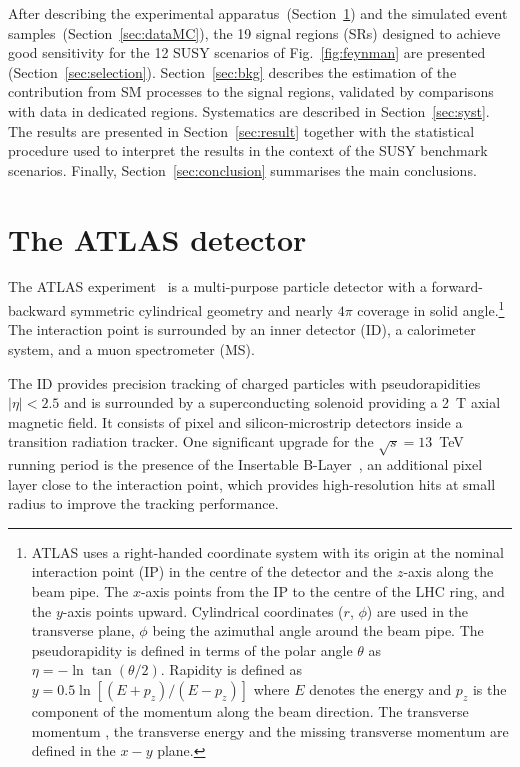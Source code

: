 \documentclass{outhesis}
\begin{document}
After describing the experimental apparatus~(Section~\ref{sec:detector}) and
the simulated event samples~(Section~\ref{sec:dataMC}), the 19 signal regions (SRs) designed to achieve 
good sensitivity for the 12 SUSY scenarios of Fig.~\ref{fig:feynman} are presented (Section~\ref{sec:selection}).
Section~\ref{sec:bkg} describes the estimation of the contribution from SM processes to the signal regions, 
validated by comparisons with data in dedicated regions. Systematics are described in Section~\ref{sec:syst}. 
The results are presented in Section~\ref{sec:result} together with the statistical procedure used to interpret 
the results in the context of the SUSY benchmark scenarios. Finally, Section~\ref{sec:conclusion} summarises the main conclusions.

\section{The ATLAS detector}
\label{sec:detector}

The ATLAS experiment~\cite{PERF-2007-01} is a multi-purpose particle detector with a forward-backward symmetric cylindrical
geometry and nearly $4\pi$ coverage in solid angle.\footnote{ATLAS uses
  a right-handed coordinate system with its origin at the nominal
  interaction point (IP) in the centre of the detector and the
  $z$-axis along the beam pipe. The $x$-axis points from the IP to the
  centre of the LHC ring, and the $y$-axis points upward. Cylindrical
  coordinates ($r$, $\phi$) are used in the transverse plane, $\phi$
  being the azimuthal angle around the beam pipe. The pseudorapidity
  is defined in terms of the polar angle $\theta$ as $\eta = -\ln
  \tan(\theta/2)$. Rapidity is defined as $y=0.5 \ln\left[(E + p_z )/(E - p_z )\right]$ 
  where $E$ denotes the energy and $p_z$ is the component of the momentum along the beam direction. 
  The transverse momentum \pt, the transverse energy \et and the missing transverse momentum \met 
  are defined in the $x-y$ plane.}
The interaction point is surrounded by an inner detector (ID), a
calorimeter system, and a muon spectrometer (MS).

The ID provides precision tracking of charged particles with
pseudorapidities $|\eta| < 2.5$ and is surrounded by a superconducting solenoid providing a \SI{2}{T} axial magnetic field.
It consists of pixel and silicon-microstrip detectors inside a
transition radiation tracker. One significant upgrade for the $\sqrt{s}=13$~TeV running period is the presence of the
Insertable B-Layer~\cite{CERN-LHCC-2010-013}, an additional pixel layer close to the interaction point, which 
provides high-resolution hits at small radius to improve the tracking performance.
\end{document}
